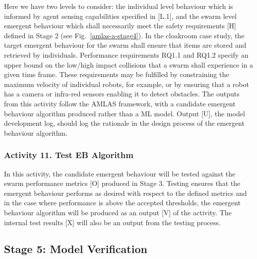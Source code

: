 \documentclass[runningheads]{llncs}
\begin{document}
Here we have two levels to consider: the individual level behaviour which is informed by agent sensing capabilities specified in [L.1], and the swarm level emergent behaviour which shall necessarily meet the safety requirements [H] defined in Stage 2 (see Fig.~\ref{amlas-a-stage4}). In the cloakroom case study, the target emergent behaviour for the swarm shall ensure that items are stored and retrieved by individuals. Performance requirements RQ1.1 and RQ1.2 specify an upper bound on the low/high impact collisions that a swarm shall experience in a given time frame. These requirements may be fulfilled by constraining the maximum velocity of individual robots, for example, or by ensuring that a robot has a camera or infra-red sensors enabling it to detect obstacles. The outputs from this activity follow the AMLAS framework, with a candidate emergent behaviour algorithm produced rather than a ML model. Output [U], the model development log, should log the rationale in the design process of the emergent behaviour algorithm.

\subsubsection*{Activity 11. Test EB Algorithm}

In this activity, the candidate emergent behaviour will be tested against the swarm performance metrics [O] produced in Stage 3. Testing ensures that the emergent behaviour performs as desired with respect to the defined metrics and in the case where performance is above the accepted thresholds, the emergent behaviour algorithm will be produced as an output [V] of the activity. The internal test results [X] will also be an output from the testing process.

\subsection{Stage 5: Model Verification} \label{framework-stage5}

\end{document}
